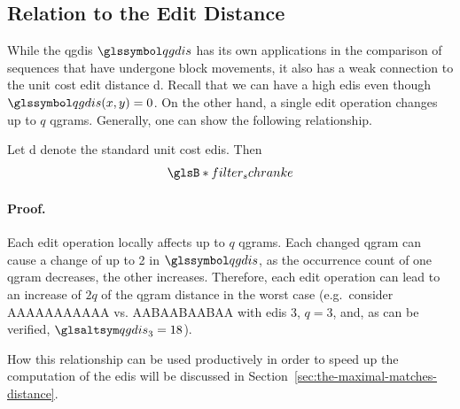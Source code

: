 \subsection{Relation to the Edit Distance}\label{subsec:relation-to-the-edit-distance2}

While the \gls{qgdis} $\dqu$ has its own applications in the comparison of sequences
that have undergone block movements, it also has a weak connection to the unit cost edit
distance d.
Recall that we can have a high \gls{edis} even though $\dqu (x, y) = 0$.
On the other hand, a single edit operation changes up to $q$ \glspl{qgram}.
Generally, one can show the following relationship.


\begin{theo} \label{thm:theorem-1-2}
    Let d denote the standard unit cost \gls{edis}.
    Then
    \begin{equation}\label{eq:filter_schranke}
        \glsB*{filter_schranke}
    \end{equation}
    \paragraph{Proof.}
    Each edit operation locally affects up to $q$ \glspl{qgram}.
    Each changed \gls{qgram} can
    cause a change of up to 2 in $\dqu$, as the occurrence count of one \gls{qgram} decreases, the
    other increases.
    Therefore, each edit operation can lead to an increase of $2q$ of the \gls{qgram}
    distance in the worst case (e.g.\ consider AAAAAAAAAAA vs.
    AABAABAABAA with \gls{edis}
    3, $q = 3$, and, as can be verified, $\dqgen_3 = 18$).

    How this relationship can be used productively in order to speed up the computation of
    the \gls{edis} will be discussed in Section~\ref{sec:the-maximal-matches-distance}.
\end{theo}

\cite{seqan_skript}


